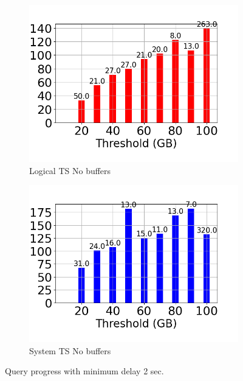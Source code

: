 \begin{figure}
	\begin{subfigure}[c]{0.45\textwidth}
		\includegraphics[width=1\textwidth]   {figures/Experiments/Dynamic/Progress/2/average_query_time_per_batch_version_999777016_10485760_10_delay[2].png}
		\caption{Logical TS No buffers}
		\label{fig:progress-queries-2-logical-no-buffers}
	\end{subfigure}
	\begin{subfigure}[c]{0.45\textwidth}
		\includegraphics[width=1\textwidth]   {figures/Experiments/Dynamic/Progress/2/average_query_time_per_batch_version_999777017_10485760_10_delay[2].png}
		\caption{System TS No buffers}
		\label{fig:progress-queries-2-system-no-buffers}
	\end{subfigure}
	\caption{Query progress with minimum delay 2 sec.}
	\label{fig:query-progress-delay-2}
\end{figure}

